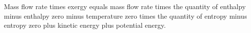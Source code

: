 Mass flow rate times exergy equals mass flow rate times the quantity of enthalpy minus enthalpy zero minus temperature zero times the quantity of entropy minus entropy zero plus kinetic energy plus potential energy.